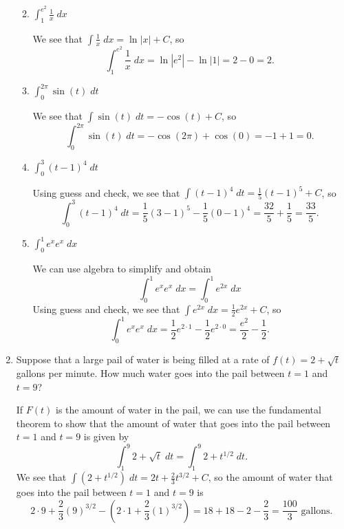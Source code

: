 \documentclass[11pt]{article}
\begin{document}
\begin{enumerate}
\begin{enumerate}
{    }
    \vfill
  \item $\displaystyle\int_1^{e^2} \frac{1}{x}\;dx$
    \vfill
    {\color{blue}

      We see that $\int \frac{1}{x}\; dx = \ln|x|+C$, so  
      \[
      \int_{1}^{e^2} \frac{1}{x}\;dx = \ln|e^2| - \ln|1| = 2 - 0 = 2.
      \]

    }
    \vfill
  \item $\displaystyle\int_0^{2\pi} \sin(t)\;dt$
    \vfill
    {\color{blue}

      We see that $\int \sin(t)\; dt = -\cos(t)+C$, so  
      \[
      \int_{0}^{2\pi} \sin(t)\;dt = -\cos(2\pi) + \cos(0) = -1 + 1 = 0.
      \]

    }
    \vfill

    \newpage
    
  \item $\displaystyle\int_0^3 (t-1)^4\;dt$
    \vfill
    {\color{blue}

      Using guess and check, we see that $\int (t-1)^4\; dt =
      \frac{1}{5}(t-1)^5 + C$, so
      \[
      \int_{0}^3 (t-1)^4\;dt = \frac{1}{5}(3-1)^5 - \frac{1}{5}(0-1)^4
      = \frac{32}{5} + \frac{1}{5} = \frac{33}{5}.
      \]

    }
    \vfill

  \item $\displaystyle\int_0^1 e^xe^x\;dx$
    \vfill
    {\color{blue}

      We can use algebra to simplify and obtain
      \[
      \int_0^1 e^xe^x\;dx = \int_0^1 e^{2x}\;dx
      \]
      Using guess and check, we see that $\int e^{2x}\; dx =
      \frac{1}{2}e^{2x}+C$, so
      \[
      \int_{0}^1 e^xe^x\;dx = \frac{1}{2}e^{2\cdot 1} -
      \frac{1}{2}e^{2\cdot 0} = \frac{e^2}{2} - \frac{1}{2}.
      \]

    }
    \vfill
  \end{enumerate}
  
  \newpage
  
\item Suppose that a large pail of water is being filled at a rate of
  $f(t) = 2+\sqrt{t}$ gallons per minute.  How much water goes into
  the pail between $t = 1$ and $t = 9$?
  
  \vfill
  {\color{blue}

    If $F(t)$ is the amount of water in the pail, we can use the
    fundamental theorem to show that the amount of water that goes
    into the pail between $t = 1$ and $t = 9$ is given by
    \[
    \int_1^9 2+\sqrt{t}\; dt = \int_1^9 2+t^{1/2}\; dt.
    \]
    We see that $\int \left(2+t^{1/2}\right)\; dt = 2t +
    \frac{2}{3}t^{3/2} + C$, so the amount of water that goes
    into the pail between $t = 1$ and $t = 9$ is
    \[
    2\cdot 9 + \frac{2}{3}(9)^{3/2} - \left(2\cdot 1 +
      \frac{2}{3}(1)^{3/2}\right) = 18 + 18 -2-\frac{2}{3} =
    \frac{100}{3}\text{ gallons}.
    \]

}
\end{enumerate}
\end{document}
